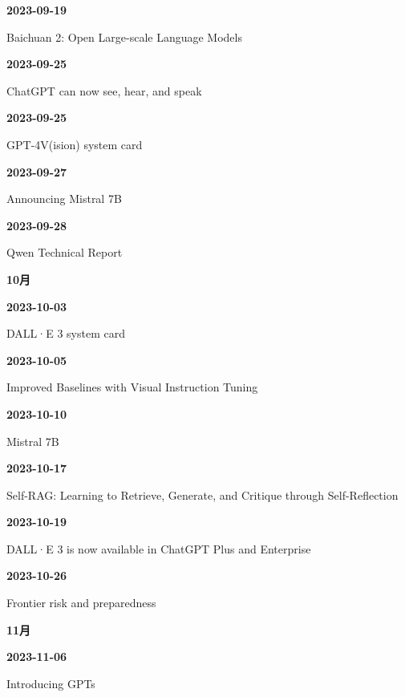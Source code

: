 \smallskip
\noindent\textbf{2023-09-19}\par
{\raggedright Baichuan 2: Open Large-scale Language Models\,\cite{chron-fa1e9c0155af}\par}
\smallskip
\noindent\textbf{2023-09-25}\par
{\raggedright ChatGPT can now see, hear, and speak\,\cite{src-f951bda6a0f4}\par}
\smallskip
\noindent\textbf{2023-09-25}\par
{\raggedright GPT-4V(ision) system card\,\cite{src-a95452783369}\par}
\smallskip
\noindent\textbf{2023-09-27}\par
{\raggedright Announcing Mistral 7B\,\cite{src-00c370ab2324}\par}
\smallskip
\noindent\textbf{2023-09-28}\par
{\raggedright Qwen Technical Report\,\cite{src-5c8e2db8871a}\par}
\smallskip
\medskip
\noindent\textbf{10月}\par
\smallskip
\noindent\textbf{2023-10-03}\par
{\raggedright DALL·E 3 system card\,\cite{src-ba80e5e27a11}\par}
\smallskip
\noindent\textbf{2023-10-05}\par
{\raggedright Improved Baselines with Visual Instruction Tuning\,\cite{chron-6bfb909db277}\par}
\smallskip
\noindent\textbf{2023-10-10}\par
{\raggedright Mistral 7B\,\cite{src-dd2cfa98160d}\par}
\smallskip
\noindent\textbf{2023-10-17}\par
{\raggedright Self-RAG: Learning to Retrieve, Generate, and Critique through Self-Reflection\,\cite{src-e413c7ab8da4}\par}
\smallskip
\noindent\textbf{2023-10-19}\par
{\raggedright DALL·E 3 is now available in ChatGPT Plus and Enterprise\,\cite{src-9bc8e7751f80}\par}
\smallskip
\noindent\textbf{2023-10-26}\par
{\raggedright Frontier risk and preparedness\,\cite{src-a1c8df89a3c9}\par}
\smallskip
\medskip
\noindent\textbf{11月}\par
\smallskip
\noindent\textbf{2023-11-06}\par
{\raggedright Introducing GPTs\,\cite{src-4de1cea0a896}\par}
